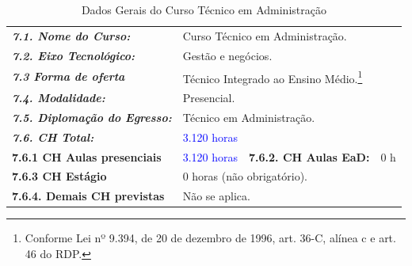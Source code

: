 \documentclass{../../modelos/latex-shared/ifsc-ppc}
\newcommand{\revisao}[1]{\textcolor{blue}{#1}}
\newcommand{\revisao}[1]{#1}
\begin{document}
\begin{table}[H]
\centering
\small
\caption{Dados Gerais do Curso Técnico em Administração}
\label{qua:dados-curso}
\vspace{0.2cm}
\begin{tabularx}{\linewidth}{|p{4.4cm}|X|p{3.8cm}|X|}
\hline
\rowcolor{cinzaTabela}
\multicolumn{4}{|l|}{\textcolor{ifscgreen}{\textbf{\large 7. Dados do Curso:}}} \\ \hline
\textcolor{ifscgreen}{\textbf{\textit{7.1. Nome do Curso:}}} & \multicolumn{3}{p{\dimexpr\linewidth-4.4cm-4\tabcolsep-3\arrayrulewidth\relax}|}{Curso Técnico em Administração.} \\ \hline
\textcolor{ifscgreen}{\textbf{\textit{7.2. Eixo Tecnológico:}}} & \multicolumn{3}{p{\dimexpr\linewidth-4.4cm-4\tabcolsep-3\arrayrulewidth\relax}|}{Gestão e negócios.} \\ \hline
\textcolor{ifscgreen}{\textbf{\textit{7.3 Forma de oferta}}} & \multicolumn{3}{p{\dimexpr\linewidth-4.4cm-4\tabcolsep-3\arrayrulewidth\relax}|}{Técnico Integrado ao Ensino Médio.\footnote{Conforme Lei nº 9.394, de 20 de dezembro de 1996, art. 36-C, alínea c e art. 46 do RDP.}} \\ \hline
\textcolor{ifscgreen}{\textbf{\textit{7.4. Modalidade:}}} & \multicolumn{3}{p{\dimexpr\linewidth-4.4cm-4\tabcolsep-3\arrayrulewidth\relax}|}{Presencial.} \\ \hline
\textcolor{ifscgreen}{\textbf{\textit{7.5. Diplomação do Egresso:}}} & \multicolumn{3}{p{\dimexpr\linewidth-4.4cm-4\tabcolsep-3\arrayrulewidth\relax}|}{Técnico em Administração.} \\ \hline
\textcolor{ifscgreen}{\textbf{\textit{7.6. CH Total:}}} & \multicolumn{3}{p{\dimexpr\linewidth-4.4cm-4\tabcolsep-3\arrayrulewidth\relax}|}{\revisao{3.120 horas}} \\ \hline
\textcolor{ifscgreen}{\textbf{7.6.1 CH Aulas presenciais}} & \revisao{3.120 horas} & \textcolor{ifscgreen}{\textbf{7.6.2. CH Aulas EaD:}} & 0 h \\ \hline
\textcolor{ifscgreen}{\textbf{7.6.3 CH Estágio}} & \multicolumn{3}{p{\dimexpr\linewidth-4.4cm-4\tabcolsep-3\arrayrulewidth\relax}|}{0 horas (não obrigatório).} \\ \hline
\textcolor{ifscgreen}{\textbf{7.6.4. Demais CH previstas}} & \multicolumn{3}{p{\dimexpr\linewidth-4.4cm-4\tabcolsep-3\arrayrulewidth\relax}|}{Não se aplica.} \\ \hline
\end{tabularx}
\end{table}
\end{document}
